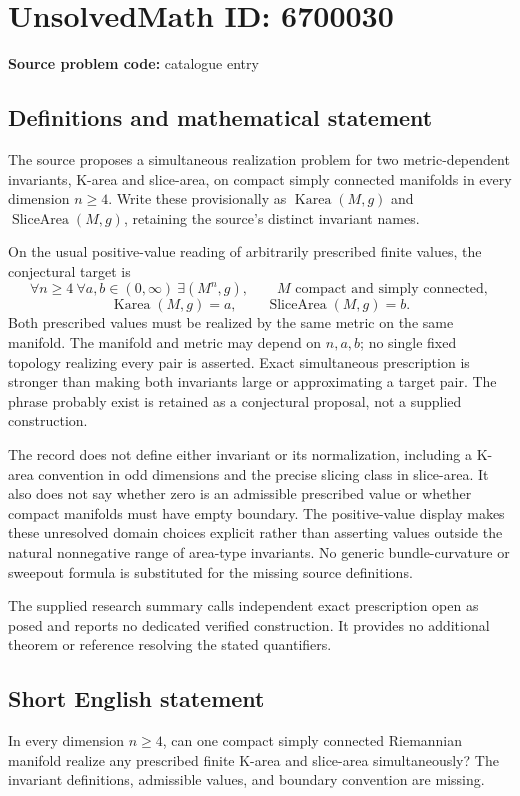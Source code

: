 \documentclass[11pt]{article}
\begin{document}
\section*{UnsolvedMath ID: 6700030}
\textbf{Source problem code:} catalogue entry
\subsection{Definitions and mathematical statement}
The source proposes a simultaneous realization problem for two metric-dependent invariants, K-area and slice-area, on compact simply connected manifolds in every dimension \(n\ge4\). Write these provisionally as \(\operatorname{Karea}(M,g)\) and \(\operatorname{SliceArea}(M,g)\), retaining the source's distinct invariant names.

On the usual positive-value reading of arbitrarily prescribed finite values, the conjectural target is
\[
\forall n\ge4\ \forall a,b\in(0,\infty)\ \exists(M^n,g),\qquad
M\text{ compact and simply connected},
\]
\[
\operatorname{Karea}(M,g)=a,\qquad
\operatorname{SliceArea}(M,g)=b.
\]
Both prescribed values must be realized by the same metric on the same manifold. The manifold and metric may depend on \(n,a,b\); no single fixed topology realizing every pair is asserted. Exact simultaneous prescription is stronger than making both invariants large or approximating a target pair. The phrase probably exist is retained as a conjectural proposal, not a supplied construction.

The record does not define either invariant or its normalization, including a K-area convention in odd dimensions and the precise slicing class in slice-area. It also does not say whether zero is an admissible prescribed value or whether compact manifolds must have empty boundary. The positive-value display makes these unresolved domain choices explicit rather than asserting values outside the natural nonnegative range of area-type invariants. No generic bundle-curvature or sweepout formula is substituted for the missing source definitions.

The supplied research summary calls independent exact prescription open as posed and reports no dedicated verified construction. It provides no additional theorem or reference resolving the stated quantifiers.
\subsection{Short English statement}
In every dimension \(n\ge4\), can one compact simply connected Riemannian manifold realize any prescribed finite K-area and slice-area simultaneously? The invariant definitions, admissible values, and boundary convention are missing.
\end{document}
